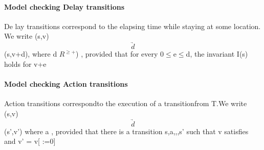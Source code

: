 \paragraph{Model checking Delay transitions}
De lay transitions correspond to the  elapsing time while staying at some location. We write (s,v)  $$\underrightarrow{d}  $$ (s,v+d), where d \in $R^{ \geq +}$) , provided that for every 0$\le$e$\le$d, the invariant I(s) holds for v+e
\paragraph{Model checking Action transitions}
Action transitions correspondto the execution of a transitionfrom T.We write (s,v) $$\underrightarrow{d}  $$ (s',v') where a \in \Sigma, provided that there  is a transition \langle s,a,\phi,\lambda,s' \rangle such  that v satisfies \varphi and v' = v[ \lambda :=0]


% 
\Re \\
\patial \\